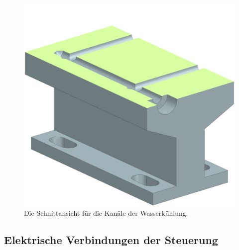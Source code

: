 \begin{appendix}
\begin{figure}[H]
    \centering
    \includegraphics[scale=0.35]{98_images/kuehlblock_section.PNG}
    \caption{Die Schnittansicht für die Kanäle der Wasserkühlung.}
    \label{fig:enter-label}
\end{figure}

\subsection{Elektrische Verbindungen der Steuerung}

\label{section:_libraries_py}


\end{appendix}
